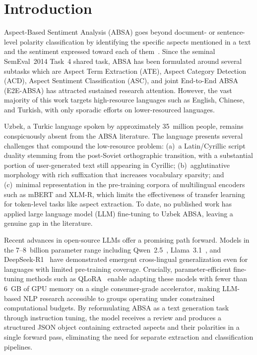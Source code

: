 \documentclass[runningheads]{llncs}
\begin{document}
\section{Introduction}
\label{sec:introduction}

Aspect-Based Sentiment Analysis (ABSA) goes beyond document- or sentence-level polarity classification by identifying the specific aspects mentioned in a text and the sentiment expressed toward each of them~\cite{pontiki-etal-2014-semeval}. Since the seminal SemEval~2014 Task~4 shared task, ABSA has been formulated around several subtasks which are Aspect Term Extraction (ATE), Aspect Category Detection (ACD), Aspect Sentiment Classification (ASC), and joint End-to-End ABSA (E2E-ABSA) has attracted sustained research attention. However, the vast majority of this work targets high-resource languages such as English, Chinese, and Turkish, with only sporadic efforts on lower-resourced languages.

Uzbek, a Turkic language spoken by approximately 35~million people, remains conspicuously absent from the ABSA literature. The language presents several challenges that compound the low-resource problem: (a)~a Latin/Cyrillic script duality stemming from the post-Soviet orthographic transition, with a substantial portion of user-generated text still appearing in Cyrillic; (b)~agglutinative morphology with rich suffixation that increases vocabulary sparsity; and (c)~minimal representation in the pre-training corpora of multilingual encoders such as mBERT and XLM-R, which limits the effectiveness of transfer learning for token-level tasks like aspect extraction. To date, no published work has applied large language model (LLM) fine-tuning to Uzbek ABSA, leaving a genuine gap in the literature.

Recent advances in open-source LLMs offer a promising path forward. Models in the 7--8~billion parameter range including Qwen~2.5~\cite{Qwen2024-kr}, Llama~3.1~\cite{Grattafiori2024-ka,Touvron2023-lf}, and DeepSeek-R1~\cite{DeepSeek-AI2026-vt} have demonstrated emergent cross-lingual generalization even for languages with limited pre-training coverage. Crucially, parameter-efficient fine-tuning methods such as QLoRA~\cite{10.5555/3666122.3666563} enable adapting these models with fewer than 6~GB of GPU memory on a single consumer-grade accelerator, making LLM-based NLP research accessible to groups operating under constrained computational budgets. By reformulating ABSA as a text generation task through instruction tuning, the model receives a review and produces a structured JSON object containing extracted aspects and their polarities in a single forward pass, eliminating the need for separate extraction and classification pipelines.
\end{document}
